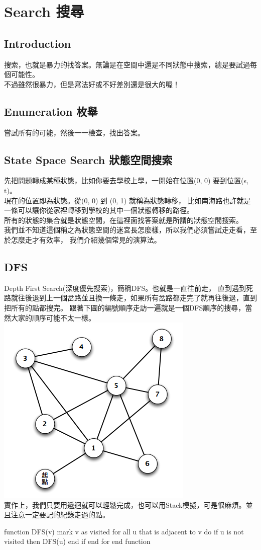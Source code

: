 \documentclass{article}
\begin{document}
\section{Search 搜尋}
\subsection*{Introduction}
搜索，也就是暴力的找答案。無論是在空間中還是不同狀態中搜索，總是要試過每個可能性。\\
不過雖然很暴力，但是寫法好或不好差別還是很大的喔！

\subsection{Enumeration 枚舉}
嘗試所有的可能，然後一一檢查，找出答案。

\subsection{State Space Search 狀態空間搜索}
先把問題轉成某種狀態，比如你要去學校上學，一開始在位置(0, 0) 要到位置(s, t)。\\
現在的位置即為狀態。從(0, 0) 到 (0, 1) 就稱為狀態轉移，
比如南海路也許就是一條可以讓你從家裡轉移到學校的其中一個狀態轉移的路徑。\\
所有的狀態的集合就是狀態空間，在這裡面找答案就是所謂的狀態空間搜索。\\
我們並不知道這個稱之為狀態空間的迷宮長怎麼樣，所以我們必須嘗試走走看，至於怎麼走才有效率，
我們介紹幾個常見的演算法。

\subsection{DFS}
Depth First Search(深度優先搜索)，簡稱DFS。也就是一直往前走，
直到遇到死路就往後退到上一個岔路並且換一條走，如果所有岔路都走完了就再往後退，直到把所有的點都搜完。
跟著下圖的編號順序走訪一遍就是一個DFS順序的搜尋，當然大家的順序可能不太一樣。\\
\includegraphics[width=0.5\columnwidth]{DFS.png}\\
實作上，我們只要用遞迴就可以輕鬆完成，也可以用Stack模擬，可是很麻煩。並且注意一定要記的紀錄走過的點。
\begin{algorithm}[caption={DFS}, label={alg1}]
function DFS(v)
    mark v as visited
    for all u that is adjacent to v do
        if u is not visited then
            DFS(u)
        end if
    end for
end function
\end{algorithm}
\end{document}

